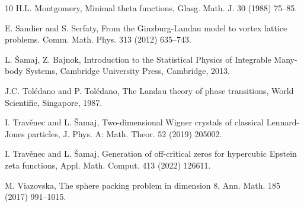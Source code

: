 \documentclass[12pt]{interact}
\theoremstyle{definition}
\begin{document}
\begin{thebibliography}{10}
 H.L. Montgomery,
Minimal theta functions,
Glasg. Math. J. 30 (1988) 75--85.
 
 E. Sandier and S. Serfaty,
From the Ginzburg-Landau model to vortex lattice problems.
Comm. Math. Phys. 313 (2012) 635--743.

 L. \v{S}amaj, Z. Bajnok,
Introduction to the Statistical Physics of Integrable Many-body Systems,
Cambridge University Press, Cambridge, 2013.

 J.C. Tol\'edano and P. Tol\'edano,  
The Landau theory of phase transitions,
World Scientific, Singapore, 1987.  

 I. Trav\v{e}nec and L. \v{S}amaj,
Two-dimensional Wigner crystals of classical Lennard-Jones particles,
J. Phys. A: Math. Theor. 52 (2019) 205002.

 I. Trav\v{e}nec and L. \v{S}amaj,
Generation of off-critical zeros for hypercubic Epstein zeta functions,
Appl. Math. Comput. 413 (2022) 126611.

 M. Viazovska,
The sphere packing problem in dimension 8,
Ann. Math. 185 (2017) 991--1015.

\end{thebibliography}
\end{document}
